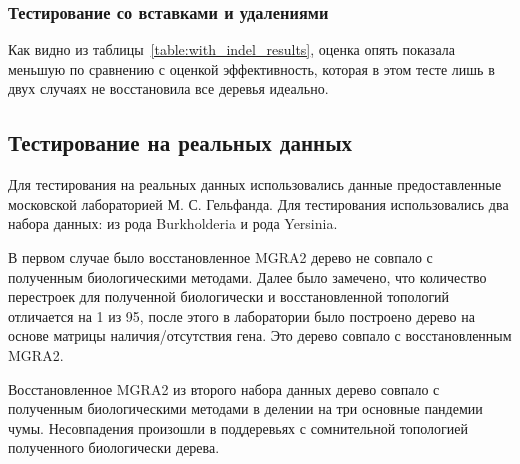 \subsubsection{Тестирование со вставками и удалениями}

Как видно из таблицы~\ref{table:with_indel_results}, оценка  опять показала меньшую
по сравнению с оценкой  эффективность, которая в этом тесте лишь в двух случаях не восстановила все деревья идеально.

\subsection{Тестирование на реальных данных}
Для тестирования на реальных данных использовались данные предоставленные московской лабораторией М. С. Гельфанда.
Для тестирования использовались два набора данных: из рода Burkholderia и рода Yersinia.

В первом случае было восстановленное MGRA2 дерево не совпало с полученным биологическими методами.
Далее было замечено, что количество перестроек для полученной биологически и восстановленной топологий отличается на 1 из 95,
после этого в лаборатории было построено дерево на основе матрицы наличия/отсутствия гена.
Это дерево совпало с восстановленным MGRA2.

Восстановленное MGRA2 из второго набора данных дерево совпало с полученным биологическими методами в делении на три основные пандемии чумы.
Несовпадения произошли в поддеревьях с сомнительной топологией полученного биологически дерева.
